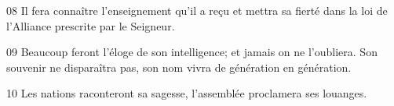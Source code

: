 
08 Il fera connaître l’enseignement qu’il a reçu et mettra sa fierté dans la loi de l’Alliance prescrite par le Seigneur.

09 Beaucoup feront l’éloge de son intelligence; et jamais on ne l’oubliera. Son souvenir ne disparaîtra pas, son nom vivra de génération en génération.

10 Les nations raconteront sa sagesse, l’assemblée proclamera ses louanges.